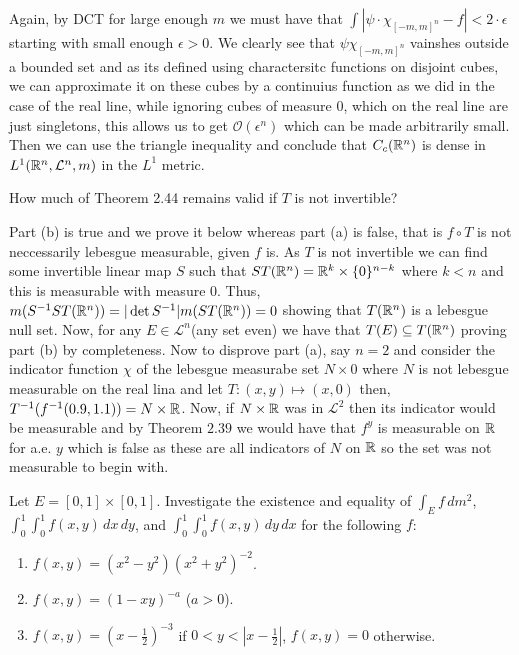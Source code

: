 \documentclass[12pt,a4paper]{article}
\begin{document}
\begin{solution}
	Again, by DCT for large enough $m$ we must have that $\int|\psi\cdot\chi_{[-m,m]^n}-f|<2\cdot\epsilon$ starting with small enough $\epsilon>0$. 
	We clearly see that $\psi\chi_{[-m,m]^n}$ vainshes outside a bounded set and as its defined using charactersitc functions on disjoint cubes, we can approximate it on these cubes by a continuius function as we did in the case of the real line, while ignoring cubes of measure $0$, which on the real line are just singletons, this allows us to get $\mathcal O(\epsilon^n)$ which can be made arbitrarily small. 
	Then we can use the triangle inequality and conclude that $C_c(\mathbb{R}^n)$ is dense in $L^1(\mathbb{R}^n,\mathcal L^n,m)$ in the $L^1$ metric.
\end{solution}
\begin{problem}\label{prob:2-54}
How much of Theorem 2.44 remains valid if $T$ is not invertible?
\end{problem}
\begin{solution}
	Part (b) is true and we prove it below whereas part (a) is false, that is $f\circ T$ is not neccessarily lebesgue measurable, given $f$ is. 
	As $T$ is not invertible we can find some invertible linear map $S$ such that $ST(\mathbb{R}^n)=\mathbb{R}^k\times\{0\}^{n-k}$ where $k<n$ and this is measurable with  measure $0$. 
	Thus, $m(S^{-1}ST(\mathbb{R}^n))=|\det S^{-1}|m(ST(\mathbb{R}^n))=0$ showing that $T(\mathbb{R}^n)$ is a lebesgue null set.
	Now, for any $E\in\mathcal L^n$(any set even) we have that $T(E)\subseteq T(\mathbb{R}^n)$ proving part (b) by completeness. 
	Now to disprove part (a), say $n=2$ and consider the indicator function $\chi$ of the lebesgue measurabe set $N\times 0$ where $N$ is not lebesgue measurable on the real lina and let $T:(x,y)\mapsto(x,0)$ then, $T^{-1}(f^{-1}(0.9,1.1))=N\times\mathbb{R}$. 
	Now, if $N\times\mathbb{R}$ was in $\mathcal L^2$ then its indicator would be measurable and by Theorem $2.39$ we would have that $f^y$ is measurable on $\mathbb{R}$ for a.e. $y$ which is false as these are all indicators of $N$ on $\mathbb{R}$ so the set was not measurable to begin with.
\end{solution}
\begin{problem}\label{prob:2-55}
Let $E = [0, 1] \times [0, 1]$. Investigate the existence and equality of $\int_E f \, dm^2$, $\int_0^1 \int_0^1 f(x, y) \, dx \, dy$, and $\int_0^1 \int_0^1 f(x, y) \, dy \, dx$ for the following $f$:
\begin{enumerate}[label=\alph*.]
    \item $f(x, y) = (x^2 - y^2)(x^2 + y^2)^{-2}$.
    \item $f(x, y) = (1 - xy)^{-a}$ ($a > 0$).
    \item $f(x, y) = (x - \frac{1}{2})^{-3}$ if $0 < y < |x - \frac{1}{2}|$, $f(x, y) = 0$ otherwise.
\end{enumerate}
\end{problem}
\end{document}
